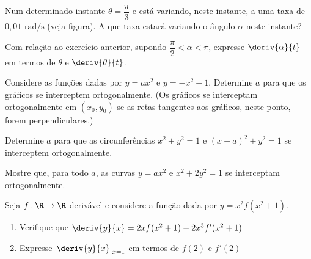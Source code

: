 \begin{exercicio}[15]
Num determinado instante $\theta = \dfrac{\pi}{3}$ e está variando, neste instante, a uma taxa de $0{,}01\text{ rad/s}$ (veja figura). A que taxa estará variando o ângulo $\alpha$ neste instante?

\begin{center}
\end{center}
\end{exercicio}

\begin{exercicio}[16]
Com relação ao exercício anterior, supondo $\dfrac{\pi}{2} < \alpha < \pi$, expresse $\deriv{\alpha}{t}$ em termos de $\theta$ e $\deriv{\theta}{t}$.
\end{exercicio}

\begin{exercicio}[17]
Considere as funções dadas por $y = ax^2$ e $y = -x^2 + 1$. Determine $a$ para que os gráficos se interceptem ortogonalmente. (Os gráficos se interceptam ortogonalmente em $(x_0, y_0)$ se as retas tangentes aos gráficos, neste ponto, forem perpendiculares.)
\end{exercicio}

\begin{exercicio}[18]
Determine $a$ para que as circunferências $x^2 + y^2 = 1$ e $(x - a)^2 + y^2 = 1$ se interceptem ortogonalmente.
\end{exercicio}

\begin{exercicio}[19]
Mostre que, para todo $a$, as curvas $y = ax^2$ e $x^2 + 2y^2 = 1$ se interceptam ortogonalmente.
\end{exercicio}

\begin{exercicio}[20]
Seja $f\colon \R \to \R$ derivável e considere a função dada por $y = x^2 f(x^2 + 1)$.
\begin{enumerate}[label=\alph*)]
    \item Verifique que $\deriv{y}{x} = 2x f(x^2 + 1) + 2x^3 f'(x^2 + 1)$
    \item Expresse $\left.\deriv{y}{x}\right|_{x = 1}$ em termos de $f(2)$ e $f'(2)$
\end{enumerate}
\end{exercicio}

